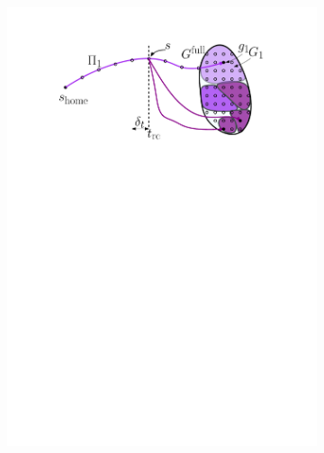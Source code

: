 \documentclass[conference]{IEEEtran}
\begin{document}
\begin{figure}[t]
\begin{subfigure}{0.225\textwidth}
        \includegraphics[width=\textwidth]{Latching_2}
        \caption{}
        \label{fig:pl2}
    \end{subfigure} 
    \begin{subfigure}{0.225\textwidth}

\end{subfigure}
\end{figure}
\end{document}
